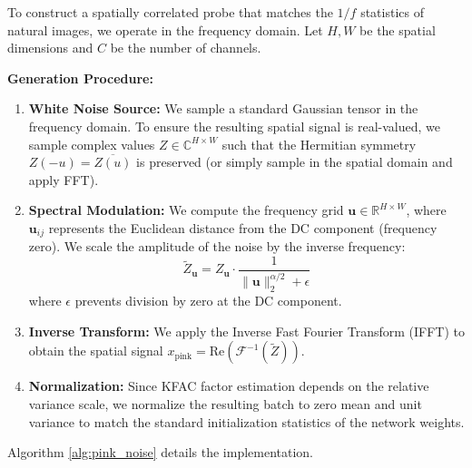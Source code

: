\documentclass{article}
\theoremstyle{plain}
\theoremstyle{definition}
\theoremstyle{remark}
\begin{document}
To construct a spatially correlated probe that matches the $1/f$ statistics of natural images, we operate in the frequency domain. Let $H, W$ be the spatial dimensions and $C$ be the number of channels.

\textbf{Generation Procedure:}
\begin{enumerate}
    \item \textbf{White Noise Source:} We sample a standard Gaussian tensor in the frequency domain. To ensure the resulting spatial signal is real-valued, we sample complex values $Z \in \mathbb{C}^{H \times W}$ such that the Hermitian symmetry $Z(-u) = \overline{Z(u)}$ is preserved (or simply sample in the spatial domain and apply FFT).
    \item \textbf{Spectral Modulation:} We compute the frequency grid $\mathbf{u} \in \mathbb{R}^{H \times W}$, where $\mathbf{u}_{ij}$ represents the Euclidean distance from the DC component (frequency zero). We scale the amplitude of the noise by the inverse frequency:
    \begin{equation}
        \tilde{Z}_{\mathbf{u}} = Z_{\mathbf{u}} \cdot \frac{1}{\|\mathbf{u}\|_2^{\alpha/2} + \epsilon}
    \end{equation}
    where $\epsilon$ prevents division by zero at the DC component.
    \item \textbf{Inverse Transform:} We apply the Inverse Fast Fourier Transform (IFFT) to obtain the spatial signal $x_{\text{pink}} = \text{Re}(\mathcal{F}^{-1}(\tilde{Z}))$.
    \item \textbf{Normalization:} Since KFAC factor estimation depends on the relative variance scale, we normalize the resulting batch to zero mean and unit variance to match the standard initialization statistics of the network weights.
\end{enumerate}

Algorithm \ref{alg:pink_noise} details the implementation.
\end{document}
